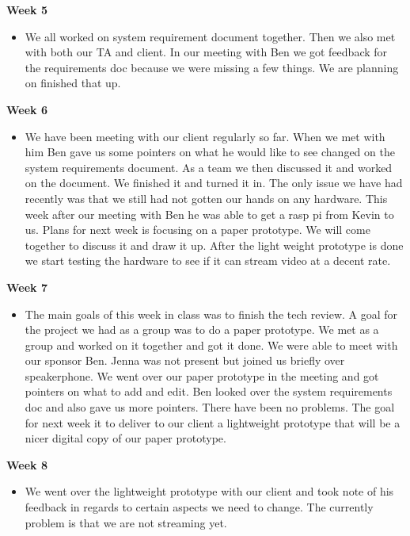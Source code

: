 \documentclass[onecolumn, draftclsnofoot,10pt, compsoc]{IEEEtran}
\begin{document}
            \textbf{Week 5}
            \begin{itemize}
                \item We all worked on system requirement document together. Then we also met with both our TA and client. In our meeting with Ben we got feedback for the requirements doc because we were missing a few things. We are planning on finished that up.
            \end{itemize}
            
            \textbf{Week 6}
            \begin{itemize}
                \item We have been meeting with our client regularly so far. When we met with him Ben gave us some pointers on what he would like to see changed on the system requirements document. As a team we then discussed it and worked on the document. We finished it and turned it in. The only issue we have had recently was that we still had not gotten our hands on any hardware. This week after our meeting with Ben he was able to get a rasp pi from Kevin to us. Plans for next week is focusing on a paper prototype. We will come together to discuss it and draw it up. After the light weight prototype is done we start testing the hardware to see if it can stream video at a decent rate.
            \end{itemize}
            \newpage
            \textbf{Week 7}
            \begin{itemize}
                \item The main goals of this week in class was to finish the tech review. A goal for the project we had as a group was to do a paper prototype. We met as a group and worked on it together and got it done. We were able to meet with our sponsor Ben. Jenna was not present but joined us briefly over speakerphone. We went over our paper prototype in the meeting and got pointers on what to add and edit. Ben looked over the system requirements doc and also gave us more pointers. There have been no problems. The goal for next week it to deliver to our client a lightweight prototype that will be a nicer digital copy of our paper prototype.
            \end{itemize}
            
            \textbf{Week 8}
            \begin{itemize}
                \item We went over the lightweight prototype with our client and took note of his feedback in regards to certain aspects we need to change. The currently problem is that we are not streaming yet.
            \end{itemize}
            
\end{document}
